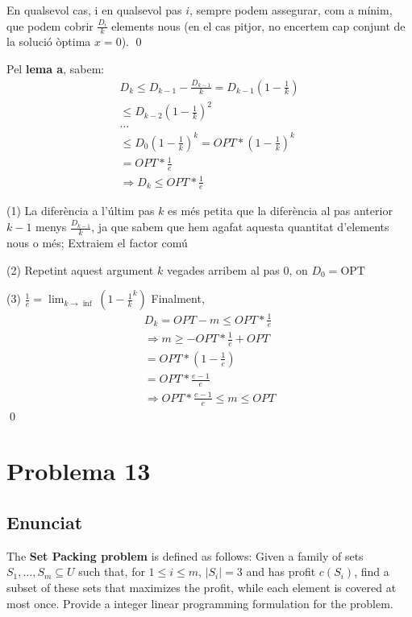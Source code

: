 \documentclass{article}
\begin{document}
En qualsevol cas, i en qualsevol pas $i$, sempre podem assegurar, com a mínim, que podem cobrir $\frac{D_i}{k}$ elements nous (en el cas pitjor, no encertem cap conjunt de la solució òptima $x=0$).
\qed

Pel \textbf{lema a}, sabem:
\begin{eqnarray}
    D_k \leq D_{k-1}-\frac{D_{k-1}}{k} = D_{k-1}(1-\frac{1}{k})\\
    \leq D_{k-2}(1-\frac{1}{k})^2 \nonumber\\
    ... \nonumber \\
    \leq D_{0}(1-\frac{1}{k})^k = OPT*(1-\frac{1}{k})^k \\
    = OPT* \frac{1}{e} \\
    \Rightarrow D_k \leq OPT* \frac{1}{e} \nonumber
\end{eqnarray}
\par
(1) La diferència a l'últim pas $k$ es més petita que la diferència al pas anterior $k-1$ menys $\frac{D_{k-1}}{k}$, ja que sabem que hem agafat aquesta quantitat d'elements nous o més; Extraiem el factor comú
\newline
\par
(2) Repetint aquest argument $k$ vegades arribem al pas 0, on $D_0 = \text{OPT}$
\newline
\par
(3) $\frac{1}{e}=\lim_{k \longrightarrow \inf}(1-\frac{1}{k}^k)$
\newline
\newline
Finalment,
\begin{eqnarray}
    D_k = OPT - m \leq OPT*\frac{1}{e} \nonumber\\ 
    \Rightarrow m \geq -OPT*\frac{1}{e}+OPT \nonumber\\
    = OPT*(1-\frac{1}{e}) \nonumber\\
    = OPT*\frac{e-1}{e}  \nonumber\\
    \Rightarrow OPT*\frac{e-1}{e} \leq m \leq OPT \nonumber
\end{eqnarray}
\renewcommand\qedsymbol{$\blacksquare$}
\qed
\newpage
\section{Problema 13}
\subsection{Enunciat}
The \textbf{Set Packing problem} is defined as follows: 
\newline 
Given a family of sets $S_1,...,S_m \subseteq U$ such that, for $1 \leq i \leq m$, $|S_i| = 3$ and has profit $c(S_i)$, find a subset of these sets that maximizes the profit, while each element is covered at most once. Provide a integer linear programming formulation for the problem.
\end{document}
